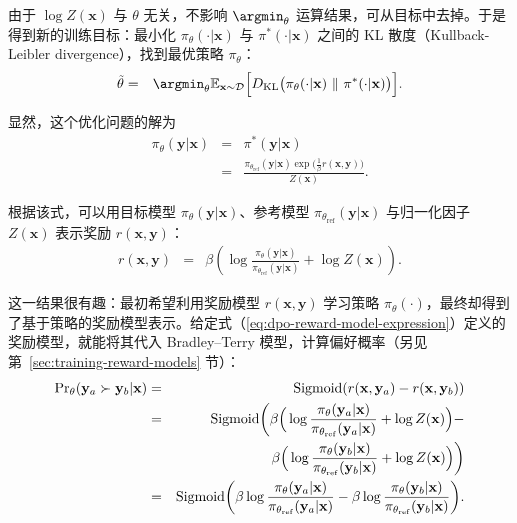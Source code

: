 由于 $\log Z(\mathbf{x})$ 与 $\theta$ 无关，不影响 $\argmin_{\theta}$ 运算结果，可从目标中去掉。于是得到新的训练目标：最小化 $\pi_{\theta}(\cdot|\mathbf{x})$ 与 $\pi^{*}(\cdot|\mathbf{x})$ 之间的 KL 散度（Kullback-Leibler divergence），找到最优策略 $\pi_{\theta}$：
\begin{eqnarray}
\tilde{\theta} & = & \argmin_{\theta} \mathbb{E}_{\mathbf{x} \sim \mathcal{D}} \Big[ D_{\mathrm{KL}} \big(\pi_{\theta}(\cdot|\mathbf{x})\ \|\ \pi^{*}(\cdot|\mathbf{x}) \big) \Big].
\end{eqnarray}

显然，这个优化问题的解为
\begin{eqnarray}
\pi_{\theta}(\mathbf{y}|\mathbf{x}) & = & \pi^{*}(\mathbf{y}|\mathbf{x}) \nonumber \\
& = & \frac{\pi_{\theta_{\mathrm{ref}}}(\mathbf{y}|\mathbf{x}) \exp \big(\frac{1}{\beta} r(\mathbf{x},\mathbf{y}))}{Z(\mathbf{x})}.
\end{eqnarray}

根据该式，可以用目标模型 $\pi_{\theta}(\mathbf{y}|\mathbf{x})$、参考模型 $\pi_{\theta_{\mathrm{ref}}}(\mathbf{y}|\mathbf{x})$ 与归一化因子 $Z(\mathbf{x})$ 表示奖励 $r(\mathbf{x},\mathbf{y})$：
\begin{eqnarray}
r(\mathbf{x},\mathbf{y}) & = & \beta \left(\log \frac{\pi_{\theta}(\mathbf{y}|\mathbf{x})}{\pi_{\theta_{\mathrm{ref}}}(\mathbf{y}|\mathbf{x})} + \log Z(\mathbf{x}) \right). \label{eq:dpo-reward-model-expression}
\end{eqnarray}

这一结果很有趣：最初希望利用奖励模型 $r(\mathbf{x},\mathbf{y})$ 学习策略 $\pi_{\theta}(\cdot)$，最终却得到了基于策略的奖励模型表示。给定式（\ref{eq:dpo-reward-model-expression}）定义的奖励模型，就能将其代入 Bradley–Terry 模型，计算偏好概率（另见第~\ref{sec:training-reward-models} 节）：
\begin{eqnarray}
\mathrm{Pr}_{\theta}(\mathbf{y}_a \succ \mathbf{y}_b | \mathbf{x}) & = & \mathrm{Sigmoid}(r(\mathbf{x},\mathbf{y}_a)-r(\mathbf{x},\mathbf{y}_b)) \nonumber \\
& = & \mathrm{Sigmoid}\bigg(\beta \Big(\log \frac{\pi_{\theta}(\mathbf{y}_a|\mathbf{x})}{\pi_{\theta_{\mathrm{ref}}}(\mathbf{y}_a|\mathbf{x})} + \log Z(\mathbf{x}) \Big) - \nonumber \\
&    & \hspace{4.3em} \beta \Big(\log \frac{\pi_{\theta}(\mathbf{y}_b|\mathbf{x})}{\pi_{\theta_{\mathrm{ref}}}(\mathbf{y}_b|\mathbf{x})} + \log Z(\mathbf{x}) \Big) \bigg) \nonumber \\
& = & \mathrm{Sigmoid}\bigg( \beta \log \frac{\pi_{\theta}(\mathbf{y}_a|\mathbf{x})}{\pi_{\theta_{\mathrm{ref}}}(\mathbf{y}_a|\mathbf{x})}  - \beta \log \frac{\pi_{\theta}(\mathbf{y}_b|\mathbf{x})}{\pi_{\theta_{\mathrm{ref}}}(\mathbf{y}_b|\mathbf{x})} \bigg).
\end{eqnarray}

